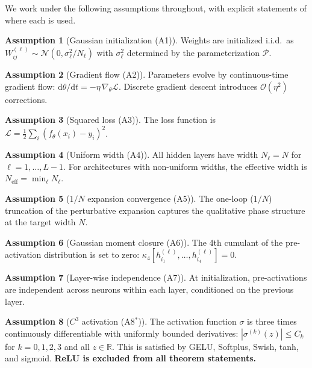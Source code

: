 \documentclass[11pt]{article}
\theoremstyle{definition}
\newtheorem{assumption}{Assumption}
\newcommand{\R}{\mathbb{R}}
\newcommand{\cL}{\mathcal{L}}
\newcommand{\cP}{\mathcal{P}}
\newcommand{\cN}{\mathcal{N}}
\newcommand{\cO}{\mathcal{O}}
\newcommand{\dd}{\mathrm{d}}
\begin{document}
We work under the following assumptions throughout, with explicit statements of where each is used.

\begin{assumption}[Gaussian initialization (A1)]
\label{ass:gaussian}
Weights are initialized i.i.d.\ as $W^{(\ell)}_{ij} \sim \cN(0, \sigma_\ell^2/N_\ell)$ with $\sigma_\ell^2$ determined by the parameterization $\cP$.
\end{assumption}

\begin{assumption}[Gradient flow (A2)]
\label{ass:gradient-flow}
Parameters evolve by continuous-time gradient flow: $\dd\theta/\dd t = -\eta\,\nabla_\theta \cL$. Discrete gradient descent introduces $\cO(\eta^2)$ corrections.
\end{assumption}

\begin{assumption}[Squared loss (A3)]
\label{ass:squared-loss}
The loss function is $\cL = \frac{1}{2}\sum_i (f_\theta(x_i) - y_i)^2$.
\end{assumption}

\begin{assumption}[Uniform width (A4)]
\label{ass:uniform-width}
All hidden layers have width $N_\ell = N$ for $\ell = 1, \ldots, L-1$. For architectures with non-uniform widths, the effective width is $N_{\mathrm{eff}} = \min_\ell N_\ell$.
\end{assumption}

\begin{assumption}[$1/N$ expansion convergence (A5)]
\label{ass:expansion}
The one-loop ($1/N$) truncation of the perturbative expansion captures the qualitative phase structure at the target width $N$.
\end{assumption}

\begin{assumption}[Gaussian moment closure (A6)]
\label{ass:moment-closure}
The 4th cumulant of the pre-activation distribution is set to zero: $\kappa_4[h^{(\ell)}_{i_1}, \ldots, h^{(\ell)}_{i_4}] = 0$.
\end{assumption}

\begin{assumption}[Layer-wise independence (A7)]
\label{ass:independence}
At initialization, pre-activations are independent across neurons within each layer, conditioned on the previous layer.
\end{assumption}

\begin{assumption}[$C^3$ activation (A8$^*$)]
\label{ass:smooth}
The activation function $\sigma$ is three times continuously differentiable with uniformly bounded derivatives: $|\sigma^{(k)}(z)| \le C_k$ for $k = 0, 1, 2, 3$ and all $z \in \R$. This is satisfied by GELU, Softplus, Swish, tanh, and sigmoid. \textbf{ReLU is excluded from all theorem statements.}
\end{assumption}
\end{document}
